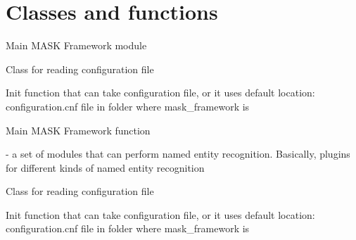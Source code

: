 \documentclass[letterpaper,10pt,english]{sphinxmanual}
\begin{document}
\chapter{Classes and functions}
\label{\detokenize{index:module-mask_framework}}\label{\detokenize{index:classes-and-functions}}
 \textendash{} Main MASK Framework module

\begin{fulllineitems}
\label{\detokenize{index:mask_framework.Configuration}}
Class for reading configuration file

Init function that can take configuration file, or it uses default location: configuration.cnf file in folder
where mask\_framework is

\end{fulllineitems}


\begin{fulllineitems}
\label{\detokenize{index:mask_framework.main}}
Main MASK Framework function

\end{fulllineitems}

\label{\detokenize{index:module-ner_plugins}}
 - a set of modules that can perform named entity recognition. Basically, plugins for different kinds of named entity recognition

\begin{fulllineitems}
Class for reading configuration file

Init function that can take configuration file, or it uses default location: configuration.cnf file in folder
where mask\_framework is

\end{fulllineitems}
\end{document}
